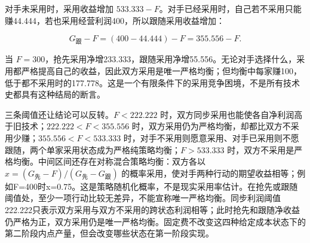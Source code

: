 \documentclass[UTF8,fontset=windows,12pt,a4paper,oneside,openany]{ctexbook}
\begin{document}
对手未采用时，采用收益增加 \(533.333-F\)。对手已经采用时，自己若不采用只能赚44.444，若也采用经营利润400，所以跟随采用收益增加：

\[
G_{\text{跟}}-F=(400-44.444)-F=355.556-F.
\tag{14-14}
\]

当 \(F=300\)，抢先采用净增233.333，跟随采用净增55.556。无论对手选择什么，采用都严格提高自己的收益，因此双方采用是唯一严格均衡；但均衡中每家赚100，低于都不采用时的177.778。这是一个有限条件下的采用竞争困境，不是所有技术史都具有这种结局的断言。

三条阈值还让结论可以反转。\(F<222.222\) 时，双方同步采用也能使各自净利润高于旧技术；\(222.222<F<355.556\) 时，双方采用仍为严格均衡，却都比双方不采用少赚；\(355.556<F<533.333\) 时，对手不采用则愿意采用、对手已采用则不愿跟随，两个单家采用状态成为严格纯策略均衡；\(F>533.333\) 时，双方不采用是严格均衡。中间区间还存在对称混合策略均衡：双方各以 \(x=(G_{\text{先}}-F)/(G_{\text{先}}-G_{\text{跟}})\) 的概率采用，使对手两种行动的期望收益相等；例如F=400时x=0.75。这是策略随机化概率，不是现实采用率估计。在抢先或跟随阈值处，至少一项行动比较无差异，不能宣称唯一严格均衡。同步利润阈值222.222只表示双方采用与双方不采用的跨状态利润相等；此时抢先和跟随净收益仍严格为正，双方采用仍是唯一严格均衡。固定费不改变这四种给定成本状态下的第二阶段内点产量，但会改变哪些状态在第一阶段实现。
\end{document}
